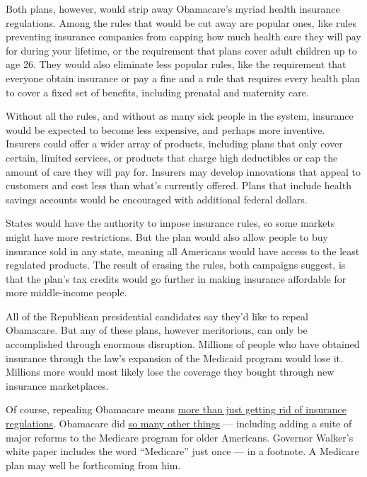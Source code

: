 Both plans, however, would strip away Obamacare's myriad health
insurance regulations. Among the rules that would be cut away are
popular ones, like rules preventing insurance companies from capping how
much health care they will pay for during your lifetime, or the
requirement that plans cover adult children up to age 26. They would
also eliminate less popular rules, like the requirement that everyone
obtain insurance or pay a fine and a rule that requires every health
plan to cover a fixed set of benefits, including prenatal and maternity
care.

Without all the rules, and without as many sick people in the system,
insurance would be expected to become less expensive, and perhaps more
inventive. Insurers could offer a wider array of products, including
plans that only cover certain, limited services, or products that charge
high deductibles or cap the amount of care they will pay for. Insurers
may develop innovations that appeal to customers and cost less than
what's currently offered. Plans that include health savings accounts
would be encouraged with additional federal dollars.

States would have the authority to impose insurance rules, so some
markets might have more restrictions. But the plan would also allow
people to buy insurance sold in any state, meaning all Americans would
have access to the least regulated products. The result of erasing the
rules, both campaigns suggest, is that the plan's tax credits would go
further in making insurance affordable for more middle-income people.

All of the Republican presidential candidates say they'd like to repeal
Obamacare. But any of these plans, however meritorious, can only be
accomplished through enormous disruption. Millions of people who have
obtained insurance through the law's expansion of the Medicaid program
would lose it. Millions more would most likely lose the coverage they
bought through new insurance marketplaces.

Of course, repealing Obamacare means
\href{http://www.nytimes.com/2015/03/18/upshot/where-the-republican-budget-plan-meets-reality-on-health-care.html}{more
than just getting rid of insurance regulations}. Obamacare did
\href{http://www.nytimes.com/2015/03/05/upshot/even-with-an-unfavorable-court-ruling-much-of-obamacare-would-live-on.html}{so
many other things} --- including adding a suite of major reforms to the
Medicare program for older Americans. Governor Walker's white paper
includes the word ``Medicare'' just once --- in a footnote. A Medicare
plan may well be forthcoming from him.

